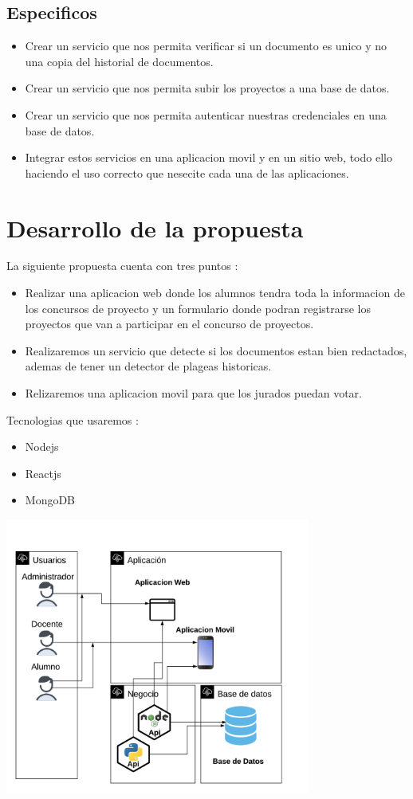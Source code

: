\documentclass[%
 reprint,
 amsmath,amssymb,
 aps,
]{revtex4-1}
\begin{document}
\subsection {Especificos}
\begin{itemize}
\item Crear un servicio que nos permita verificar si un documento es unico y no una copia del historial de documentos.
\item Crear un servicio que nos permita subir los proyectos a una base de datos.
\item Crear un servicio que nos permita autenticar nuestras credenciales en una base de datos.
\item Integrar estos servicios en una aplicacion movil y en un sitio web, todo ello haciendo el uso correcto que nesecite cada una de las aplicaciones.
\end{itemize}

\section {Desarrollo de la propuesta}
La siguiente propuesta cuenta con tres puntos :
\begin{itemize}
\item Realizar una aplicacion web donde los alumnos tendra toda la informacion de los concursos de proyecto y un formulario donde podran registrarse los proyectos que van a participar en el concurso de proyectos.
\item Realizaremos un servicio que detecte si los documentos estan bien redactados, ademas de tener un detector de plageas historicas.
\item Relizaremos una aplicacion movil para que los jurados puedan votar.
\end{itemize}
\newpage
Tecnologias que usaremos :
\begin{itemize}
\item Nodejs
\item Reactjs
\item MongoDB
\end{itemize}
\begin{center}
\includegraphics[width=10cm]{./Imagenes/arquitectura2}
\end{center}
\end{document}
